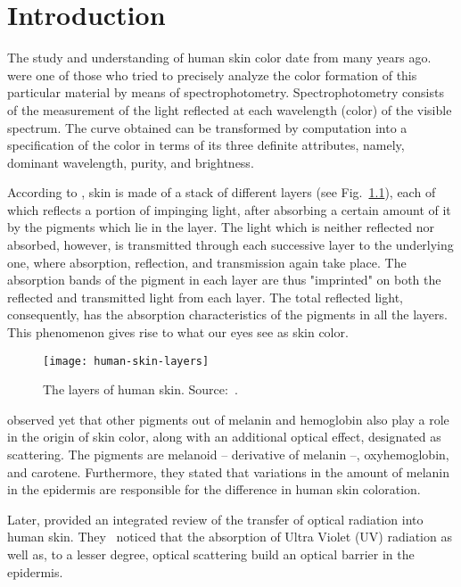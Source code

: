 \chapter{Introduction}
\label{cap:introducao}
The study and understanding of human skin color date from many years ago. \citet{edwards:39} were one of those who tried to precisely analyze the color formation of this particular material by means of spectrophotometry. Spectrophotometry consists of the measurement of the light reflected at each wavelength (color) of the visible spectrum. The curve obtained can be transformed by computation into a specification of the color in terms of its three definite attributes, namely, dominant wavelength, purity, and brightness.

According to \citet{edwards:39}, skin is made of a stack of different layers (see Fig.~\ref{fig:human-skin-layers}), each of which reflects a portion of impinging light, after absorbing a certain amount of it by the pigments which lie in the layer. The light which is neither reflected nor absorbed, however, is transmitted through each successive layer to the underlying one, where absorption, reflection, and transmission again take place. The absorption bands of the pigment in each layer are thus "imprinted" on both the reflected and transmitted light from each layer. The total reflected light, consequently, has the absorption characteristics of the pigments in all the layers. This phenomenon gives rise to what our eyes see as skin color.

\begin{figure}[!hb]
  \centering
  \texttt{[image: human-skin-layers]}
  \caption[The layers of human skin]{The layers of human skin. Source:~\citet{nanette:18}.}
  \label{fig:human-skin-layers}
\end{figure}

\citet{edwards:39} observed yet that other pigments out of melanin and hemoglobin also play a role in the origin of skin color, along with an additional optical effect, designated as scattering. The pigments are melanoid -- derivative of melanin --, oxyhemoglobin, and carotene. Furthermore, they stated that variations in the amount of melanin in the epidermis are responsible for the difference in human skin coloration.

Later, \citet{anderson:81} provided an integrated review of the transfer of optical radiation into human skin. They~\citep{anderson:81} noticed that the absorption of Ultra Violet (UV) radiation as well as, to a lesser degree, optical scattering build an optical barrier in the epidermis.

